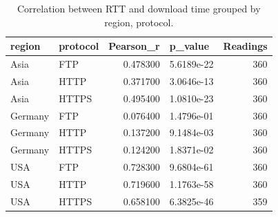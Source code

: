 \begin{table}
\caption{Correlation between RTT and download time grouped by region, protocol.}
\label{tab:correlation_by_region_protocol}
\begin{tabular}{llrlr}
\toprule
region & protocol & Pearson_r & p_value & Readings \\
\midrule
Asia & FTP & 0.478300 & 5.6189e-22 & 360 \\
Asia & HTTP & 0.371700 & 3.0646e-13 & 360 \\
Asia & HTTPS & 0.495400 & 1.0810e-23 & 360 \\
Germany & FTP & 0.076400 & 1.4796e-01 & 360 \\
Germany & HTTP & 0.137200 & 9.1484e-03 & 360 \\
Germany & HTTPS & 0.124200 & 1.8371e-02 & 360 \\
USA & FTP & 0.728300 & 9.6804e-61 & 360 \\
USA & HTTP & 0.719600 & 1.1763e-58 & 360 \\
USA & HTTPS & 0.658100 & 6.3825e-46 & 359 \\
\bottomrule
\end{tabular}
\end{table}
